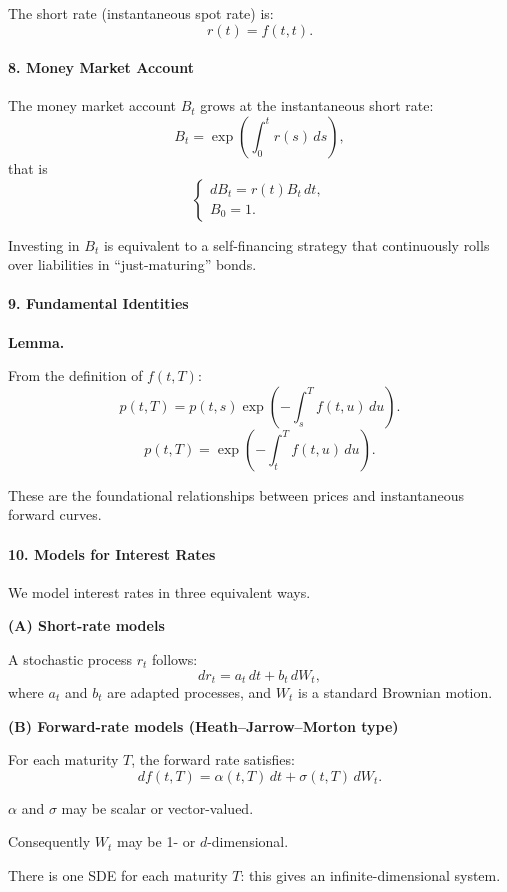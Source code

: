 \documentclass[12pt,a4paper]{article}
\theoremstyle{definition}
\begin{document}
The short rate (instantaneous spot rate) is:
\[
r(t) = f(t, t).
\]

\paragraph{8. Money Market Account}

The money market account $B_t$ grows at the instantaneous short rate:
\[
B_t = \exp\left(\int_0^t r(s) \, ds\right),
\]
that is
\[
\begin{cases}
dB_t = r(t)B_t \, dt, \\
B_0 = 1.
\end{cases}
\]

Investing in $B_t$ is equivalent to a self-financing strategy that continuously rolls over liabilities in ``just-maturing'' bonds.

\paragraph{9. Fundamental Identities}

\textbf{Lemma.}

From the definition of $f(t, T)$:
\[
p(t, T) = p(t, s) \exp\left(-\int_s^T f(t, u) \, du\right).
\]
\[
p(t, T) = \exp\!\left(-\int_t^T f(t, u) \, du\right).
\]

These are the foundational relationships between prices and instantaneous forward curves.

\paragraph{10. Models for Interest Rates}

We model interest rates in three equivalent ways.

\textbf{(A) Short-rate models}

A stochastic process $r_t$ follows:
\[
dr_t = a_t \, dt + b_t \, dW_t,
\]
where $a_t$ and $b_t$ are adapted processes, and $W_t$ is a standard Brownian motion.

\textbf{(B) Forward-rate models (Heath--Jarrow--Morton type)}

For each maturity $T$, the forward rate satisfies:
\[
df(t, T) = \alpha(t, T) \, dt + \sigma(t, T) \, dW_t.
\]

$\alpha$ and $\sigma$ may be scalar or vector-valued.

Consequently $W_t$ may be 1- or $d$-dimensional.

There is one SDE for each maturity $T$: this gives an infinite-dimensional system.
\end{document}
